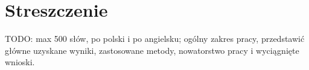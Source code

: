 \documentclass[a4paper,12pt]{article}
\author{Kołucki Rafał}
\begin{document}
\maketitle

\renewcommand{\cftsecleader}{\cftdotfill{\cftdotsep}}
\tableofcontents

\vfill

\pagebreak

\section*{Streszczenie}
TODO: max 500 słów, po polski i po angielsku; ogólny zakres pracy, przedstawić główne uzyskane wyniki, zastosowane metody, nowatorstwo pracy i wyciągnięte wnioski.

\pagebreak










\end{document}
